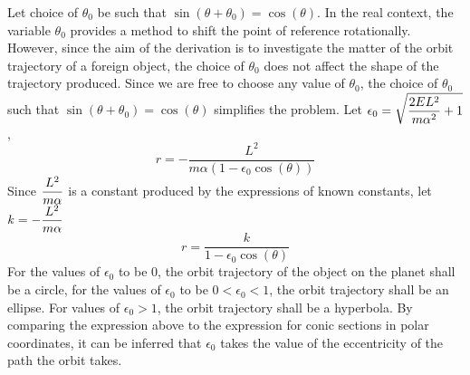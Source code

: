 \documentclass[class=report, 12pt, crop=false]{standalone}
\begin{document}
\begin{center}
Let choice of $\theta_0$ be such that $\sin{(\theta + \theta_0)} = \cos{(\theta)}$. In the real context, the variable $\theta_0$ provides a method to shift the point of reference rotationally. However, since the aim of the derivation is to investigate the matter of the orbit trajectory of a foreign object, the choice of $\theta_0$ does not affect the shape of the trajectory produced. Since we are free to choose any value of $\theta_0$, the choice of $\theta_0$ such that $\sin{(\theta + \theta_0)} = \cos{(\theta)}$ simplifies the problem. Let $\displaystyle{\epsilon_0 = \sqrt{\frac{2EL^2}{m \alpha^2}+1}}$,
$$r = -\frac{L^2}{m\alpha(1-\epsilon_0\cos{(\theta)})}$$
Since $\displaystyle{\frac{L^2}{m\alpha}}$ is a constant produced by the expressions of known constants, let $\displaystyle k = -\frac{L^2}{m\alpha}$
$$r=\frac{k}{1-\epsilon_0\cos{(\theta)}}$$
For the values of $\epsilon_0$ to be $0$, the orbit trajectory of the object on the planet shall be a circle, for the values of $\epsilon_0$ to be $0<\epsilon_0<1$, the orbit trajectory shall be an ellipse. For values of $\epsilon_0>1$, the orbit trajectory shall be a hyperbola. By comparing the expression above to the expression for conic sections in polar coordinates, it can be inferred that $\epsilon_0$ takes the value of the eccentricity of the path the orbit takes.

\end{center}
\end{document}
